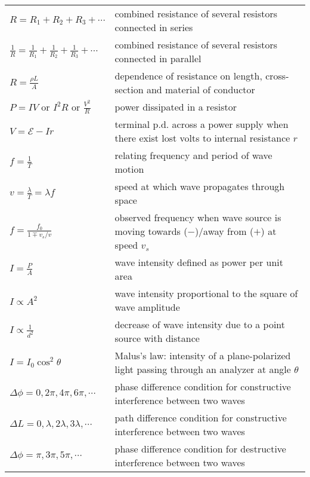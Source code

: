 {{\begin{longtable}{p{} p{}}
$R=R_1+R_2+R_3+\cdots$ & combined resistance of several resistors connected in series \\

$\frac{1}{R} = \frac{1}{R_1} + \frac{1}{R_2} + \frac{1}{R_3} +\cdots$ & combined resistance of several resistors connected in parallel \\

$R = \frac{\rho L}{A}$ & dependence of resistance on length, cross-section and material of conductor \\

$P=IV \text{ or } I^2R \text{ or } \frac{V^2}{R}$ & power dissipated in a resistor \\

$V = \mathcal{E} - Ir$ & terminal p.d. across a power supply when there exist lost volts to internal resistance $r$\\

$f=\frac{1}{T}$ & relating frequency and period of wave motion \\

$v=\frac{\lambda}{T} = \lambda f$ & speed at which wave propagates through space \\

$f = \frac{f_0}{1\mp v_s/v}$ & observed frequency when wave source is moving towards ($-$)/away from ($+$) at speed $v_s$\\

$ I = \frac{P}{A}$ & wave intensity defined as power per unit area \\

$ I \propto A^2 $ & wave intensity proportional to the square of wave amplitude \\

$ I \propto \frac{1}{d^2}$ & decrease of wave intensity due to a point source with distance \\

$ I = I_0 \cos^2\theta $ & Malus's law: intensity of a plane-polarized light passing through an analyzer at angle $\theta$ \\

$\Delta \phi = 0, 2\pi, 4\pi, 6\pi, \cdots$ & phase difference condition for constructive interference between two waves \\

$\Delta L = 0, \lambda, 2\lambda, 3\lambda, \cdots$ & path difference condition for constructive interference between two waves \\

$\Delta \phi = \pi, 3\pi, 5\pi, \cdots$ & phase difference condition for destructive interference between two waves \\


\end{longtable}}}
